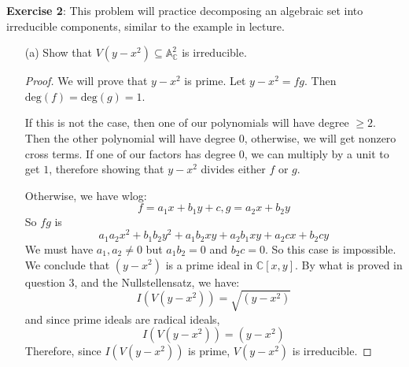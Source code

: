 \documentclass{article}
\begin{document}
\textbf{Exercise 2}: This problem will practice decomposing an algebraic set into irreducible components, similar to the example in lecture.
    \begin{itemize}
        \item [(a)] Show that $V(y - x^{2}) \subseteq \mathbb{A}^{2}_{\mathbb{C}}$ is irreducible.
            \begin{proof}
                We will prove that $y - x^{2}$ is prime. Let $y - x^{2} = fg$. Then $\text{deg}(f) = \text{deg}(g) = 1$.

                If this is not the case, then one of our polynomials will have degree $ \geq 2$. Then the other polynomial will have degree $0$, otherwise, we will get nonzero cross terms. If one of our factors has degree $0$, we can multiply by a unit to get $1$, therefore showing that $y - x^{2}$ divides either $f$ or $g$.

                Otherwise, we have wlog:
                    \begin{equation*}
                        f = a_{1}x + b_{1}y + c, g = a_{2}x + b_{2}y
                    \end{equation*}
                So $fg$ is
                    \begin{equation*}
                        a_{1}a_{2}x^{2} + b_{1}b_{2}y^{2} + a_{1}b_{2}xy + a_{2}b_{1}xy + a_{2}cx + b_{2}cy
                    \end{equation*}
                We must have $a_{1}, a_{2} \neq 0$ but $a_{1}b_{2} = 0$ and $b_{2}c = 0$.  So this case is impossible. We conclude that $(y - x^{2})$ is a prime ideal in $\mathbb{C}[x, y]$. By what is proved in question 3, and the Nullstellensatz, we have:
                    \begin{equation*}
                        I(V(y - x^{2})) = \sqrt{(y - x^{2})}
                    \end{equation*}
                and since prime ideals are radical ideals, 
                    \begin{equation*}
                        I(V(y - x^{2})) = (y - x^{2})
                    \end{equation*}
                Therefore, since $I(V(y - x^{2}))$ is prime, $V(y - x^{2})$ is irreducible.
            \end{proof}


\end{itemize}
\end{document}
